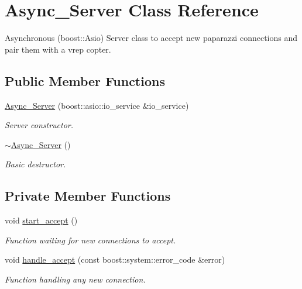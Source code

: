 \hypertarget{classAsync__Server}{}\section{Async\+\_\+\+Server Class Reference}
\label{classAsync__Server}


Asynchronous (boost\+::\+Asio) Server class to accept new paparazzi connections and pair them with a vrep copter.  


\subsection*{Public Member Functions}
\begin{DoxyCompactItemize}
\item 
\hyperlink{classAsync__Server_a33e192d098956111828840a354da0891}{Async\+\_\+\+Server} (boost\+::asio\+::io\+\_\+service \&io\+\_\+service)
\begin{DoxyCompactList}\small\item\em Server constructor. \end{DoxyCompactList}\item 
\hyperlink{classAsync__Server_a7863baf6ecf5a684b61a2bd54ea250b0}{$\sim$\+Async\+\_\+\+Server} ()
\begin{DoxyCompactList}\small\item\em Basic destructor. \end{DoxyCompactList}\end{DoxyCompactItemize}
\subsection*{Private Member Functions}
\begin{DoxyCompactItemize}
\item 
void \hyperlink{classAsync__Server_a475dc9277092d67f647cdfeeb91f2943}{start\+\_\+accept} ()
\begin{DoxyCompactList}\small\item\em Function waiting for new connections to accept. \end{DoxyCompactList}\item 
void \hyperlink{classAsync__Server_ab012fb8893a186c937c9287bdf10da03}{handle\+\_\+accept} (const boost\+::system\+::error\+\_\+code \&error)
\begin{DoxyCompactList}\small\item\em Function handling any new connection. \end{DoxyCompactList}\end{DoxyCompactItemize}
